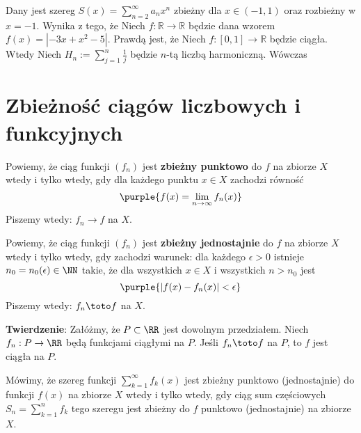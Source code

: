 \begin{problems}
    \prob Dany jest szereg $S(x) = \sum_{n = 2}^{\infty} a_n x^n$ zbieżny dla $x \in (-1, 1)$ oraz rozbieżny w $x = -1$. Wynika z tego, że
    \prob Niech $f: \mathbb{R} \to \mathbb{R}$ będzie dana wzorem $f(x) = \left|-3x+x^2-5\right|$. Prawdą jest, że
    \prob Niech $f: [0, 1] \to \mathbb{R}$ będzie ciągła. Wtedy
    \prob Niech $H_n := \sum_{j=1}^n \frac{1}{j}$ będzie $n$-tą liczbą harmoniczną. Wówczas
\end{problems}

\section{Zbieżność ciągów liczbowych i funkcyjnych}
Powiemy, że ciąg funkcji $(f_n)$ jest \textbf{zbieżny punktowo} do $f$ na zbiorze $X$ wtedy i tylko wtedy, gdy dla każdego punktu $x\in X$ zachodzi równość
$$\purple{f(x) = \lim_{n\to\infty}f_n(x)}$$
Piszemy wtedy: $f_n\to f$ na $X$.

Powiemy, że ciąg funkcji $(f_n)$ jest \textbf{zbieżny jednostajnie} do $f$ na zbiorze $X$ wtedy i tylko wtedy, gdy zachodzi warunek: dla każdego $\epsilon>0$ istnieje $n_0=n_0(\epsilon)\in\NN$ takie, że dla wszystkich $x\in X$ i wszystkich $n>n_0$ jest
$$\purple{|f(x)-f_n(x)|<\epsilon}$$
Piszemy wtedy: $f_n\toto f$ na $X$.

\textbf{Twierdzenie}:
Załóżmy, że $P\subset\RR$ jest dowolnym przedziałem. Niech $f_n:P\to\RR$ będą funkcjami ciągłymi na $P$. Jeśli $f_n\toto f$ na $P$, to $f$ jest ciągła na $P$.

Mówimy, że szereg funkcji $\sum_{k=1}^\infty f_k(x)$ jest zbieżny punktowo (jednostajnie) do funkcji $f(x)$ na zbiorze $X$ wtedy i tylko wtedy, gdy ciąg sum częściowych $S_n=\sum_{k=1}^n f_k$ tego szeregu jest zbieżny do $f$ punktowo (jednostajnie) na zbiorze $X$.

